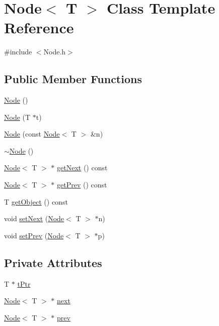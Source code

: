 \hypertarget{classNode}{}\section{Node$<$ T $>$ Class Template Reference}
\label{classNode}


{\ttfamily \#include $<$Node.\+h$>$}

\subsection*{Public Member Functions}
\begin{DoxyCompactItemize}
\item 
\hyperlink{classNode_a0ac1d44cfe588be564acf25485029bd8}{Node} ()
\item 
\hyperlink{classNode_a017842c62a2ea717a906c36442699d2b}{Node} (T $\ast$t)
\item 
\hyperlink{classNode_a6f2375c2b58a627d2c3e82c3db4b624e}{Node} (const \hyperlink{classNode}{Node}$<$ T $>$ \&n)
\item 
\hyperlink{classNode_ae923d0417581dd19784d55b901f0f7f0}{$\sim$\+Node} ()
\item 
\hyperlink{classNode}{Node}$<$ T $>$ $\ast$ \hyperlink{classNode_af8f2d178f274dd254e6e1965971f0fd0}{get\+Next} () const 
\item 
\hyperlink{classNode}{Node}$<$ T $>$ $\ast$ \hyperlink{classNode_af4e96a27c770adc291f2f7a4bc2c538d}{get\+Prev} () const 
\item 
T \hyperlink{classNode_ac1c49a2cc713ea6e8e6a22f003843d4b}{get\+Object} () const 
\item 
void \hyperlink{classNode_a0f69ba4f73cd616755f4ec0ae9fa7f96}{set\+Next} (\hyperlink{classNode}{Node}$<$ T $>$ $\ast$n)
\item 
void \hyperlink{classNode_a3c292611bdab2cbe724c841c6984fcad}{set\+Prev} (\hyperlink{classNode}{Node}$<$ T $>$ $\ast$p)
\end{DoxyCompactItemize}
\subsection*{Private Attributes}
\begin{DoxyCompactItemize}
\item 
T $\ast$ \hyperlink{classNode_ae6ced078eb7da64ab447676be5f22024}{t\+Ptr}
\item 
\hyperlink{classNode}{Node}$<$ T $>$ $\ast$ \hyperlink{classNode_a8bedac90cd0aedd2847dd49f671d4d4a}{next}
\item 
\hyperlink{classNode}{Node}$<$ T $>$ $\ast$ \hyperlink{classNode_ac953360c5f7ffae6ad13762189d34d9c}{prev}
\end{DoxyCompactItemize}


